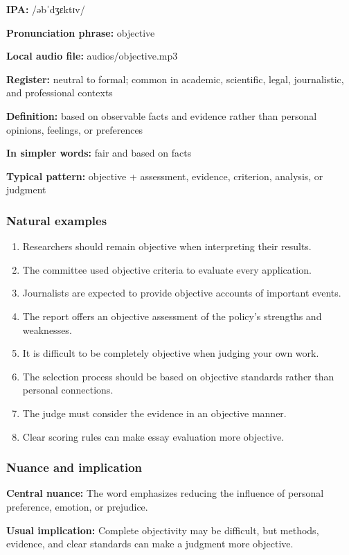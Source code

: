 \documentclass[11pt]{article}
\begin{document}
\textbf{IPA:} /əbˈdʒɛktɪv/

\textbf{Pronunciation phrase:} objective

\textbf{Local audio file:} audios/objective.mp3

\textbf{Register:} neutral to formal; common in academic, scientific, legal, journalistic, and professional contexts

\textbf{Definition:} based on observable facts and evidence rather than personal opinions, feelings, or preferences

\textbf{In simpler words:} fair and based on facts

\textbf{Typical pattern:} objective + assessment, evidence, criterion, analysis, or judgment

\subsubsection{Natural examples}
\begin{enumerate}
  \item Researchers should remain objective when interpreting their results.
  \item The committee used objective criteria to evaluate every application.
  \item Journalists are expected to provide objective accounts of important events.
  \item The report offers an objective assessment of the policy's strengths and weaknesses.
  \item It is difficult to be completely objective when judging your own work.
  \item The selection process should be based on objective standards rather than personal connections.
  \item The judge must consider the evidence in an objective manner.
  \item Clear scoring rules can make essay evaluation more objective.
\end{enumerate}

\subsubsection{Nuance and implication}
\textbf{Central nuance:} The word emphasizes reducing the influence of personal preference, emotion, or prejudice.

\textbf{Usual implication:} Complete objectivity may be difficult, but methods, evidence, and clear standards can make a judgment more objective.
\end{document}

